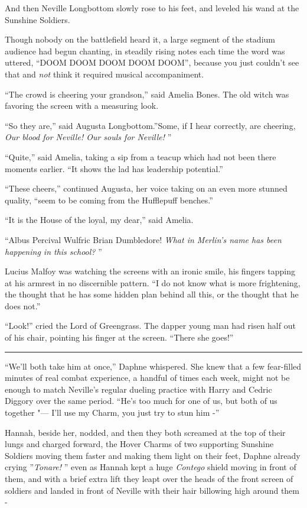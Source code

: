 And then Neville Longbottom slowly rose to his feet, and leveled his
wand at the Sunshine Soldiers.

Though nobody on the battlefield heard it, a large segment of the
stadium audience had begun chanting, in steadily rising notes each time
the word was uttered, ``DOOM DOOM DOOM DOOM DOOM'', because you just
couldn't see that and \emph{not} think it required musical
accompaniment.

``The crowd is cheering your grandson,'' said Amelia Bones. The old
witch was favoring the screen with a measuring look.

``So they are,'' said Augusta Longbottom.''Some, if I hear correctly,
are cheering, \emph{Our blood for Neville! Our souls for Neville!} ''

``Quite,'' said Amelia, taking a sip from a teacup which had not been
there moments earlier. ``It shows the lad has leadership potential.''

``These cheers,'' continued Augusta, her voice taking on an even more
stunned quality, ``seem to be coming from the Hufflepuff benches.''

``It is the House of the loyal, my dear,'' said Amelia.

``Albus Percival Wulfric Brian Dumbledore! \emph{What in Merlin's name
has been happening in this school?} ''

Lucius Malfoy was watching the screens with an ironic smile, his fingers
tapping at his armrest in no discernible pattern. ``I do not know what
is more frightening, the thought that he has some hidden plan behind all
this, or the thought that he does not.''

``Look!'' cried the Lord of Greengrass. The dapper young man had risen
half out of his chair, pointing his finger at the screen. ``There she
goes!''

\begin{center}\rule{3in}{0.4pt}\end{center}

``We'll both take him at once,'' Daphne whispered. She knew that a few
fear-filled minutes of real combat experience, a handful of times each
week, might not be enough to match Neville's regular dueling practice
with Harry and Cedric Diggory over the same period. ``He's too much for
one of us, but both of us together "--- I'll use my Charm, you just try to
stun him -''

Hannah, beside her, nodded, and then they both screamed at the top of
their lungs and charged forward, the Hover Charms of two supporting
Sunshine Soldiers moving them faster and making them light on their
feet, Daphne already crying ''\emph{Tonare!} '' even as Hannah kept a huge
\emph{Contego} shield moving in front of them, and with a brief extra
lift they leapt over the heads of the front screen of soldiers and
landed in front of Neville with their hair billowing high around them -

